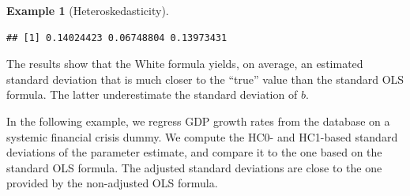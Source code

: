 \documentclass[
  12pt,
]{book}
\newenvironment{Shaded}{\begin{snugshade}}{\end{snugshade}}
\newcommand{\AttributeTok}[1]{\textcolor[rgb]{0.77,0.63,0.00}{#1}}
\newcommand{\ConstantTok}[1]{\textcolor[rgb]{0.00,0.00,0.00}{#1}}
\newcommand{\DecValTok}[1]{\textcolor[rgb]{0.00,0.00,0.81}{#1}}
\newcommand{\FunctionTok}[1]{\textcolor[rgb]{0.00,0.00,0.00}{#1}}
\newcommand{\NormalTok}[1]{#1}
\newcommand{\OtherTok}[1]{\textcolor[rgb]{0.56,0.35,0.01}{#1}}
\newcommand{\SpecialCharTok}[1]{\textcolor[rgb]{0.00,0.00,0.00}{#1}}
\newcommand{\StringTok}[1]{\textcolor[rgb]{0.31,0.60,0.02}{#1}}
\theoremstyle{definition}
\theoremstyle{definition}
\newtheorem{example}{Example}[chapter]
\theoremstyle{definition}
\theoremstyle{definition}
\theoremstyle{remark}
\begin{document}
\begin{example}[Heteroskedasticity]
\begin{verbatim}
## [1] 0.14024423 0.06748804 0.13973431
\end{verbatim}

The results show that the White formula yields, on average, an estimated standard deviation that is much closer to the ``true'' value than the standard OLS formula. The latter underestimate the standard deviation of \(b\).
\end{example}

In the following example, we regress GDP growth rates from the \citet{JST_2017} database on a systemic financial crisis dummy. We compute the HC0- and HC1-based standard deviations of the parameter estimate, and compare it to the one based on the standard OLS formula. The adjusted standard deviations are close to the one provided by the non-adjusted OLS formula.

\begin{Shaded}
\end{Shaded}
\end{document}
